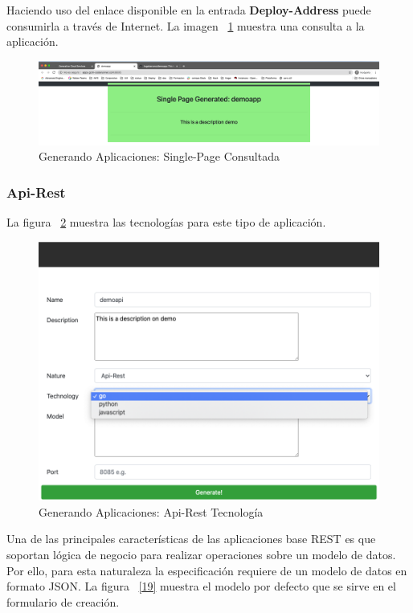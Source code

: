 \documentclass[a4paper,11pt]{book}
\begin{document}
 Haciendo uso del enlace disponible en la entrada \textbf{Deploy-Address} puede consumirla a través de Internet. La imagen ~\ref{17} muestra una consulta a  la aplicación. 

\begin{figure}[H]
\centering
\includegraphics[scale=0.2]{imagenes/casouso_a/17.png}
\caption{  Generando Aplicaciones: Single-Page Consultada }
\label{17}
\end{figure}

\newpage
\subsubsection{Api-Rest}

La figura ~\ref{18} muestra las tecnologías para este tipo de aplicación. 

\begin{figure}[H]
\centering
\includegraphics[scale=0.37]{imagenes/casouso_a/18.png}
\caption{  Generando Aplicaciones: Api-Rest Tecnología }
\label{18}
\end{figure}

Una de las principales características de las aplicaciones base REST es que soportan lógica de negocio para realizar operaciones sobre un modelo de datos. Por ello, para esta naturaleza la especificación requiere de un modelo de datos en formato JSON. La figura ~\ref{19} muestra el modelo por defecto que se sirve en el formulario de creación. 
\end{document}
